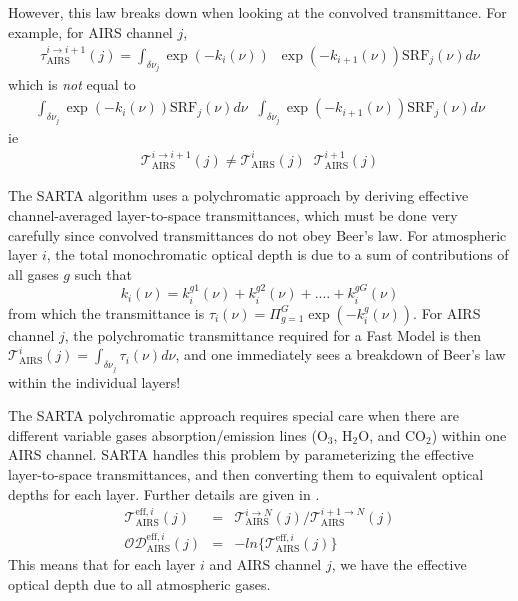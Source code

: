 \documentclass[11pt]{article}
\newcommand{\sa}{\textsf{SARTA}\xspace}
\newcommand{\cd}{CO$_2$\xspace}
\newcommand{\water}{H$_2$O\xspace}
\newcommand{\ozone}{O$_3$\xspace}
\begin{document}
However, this law breaks down when looking at the convolved
transmittance. For example, for AIRS channel $j$,
\begin{eqnarray*}
  \tau_{\text{AIRS}}^{i \rightarrow i+1}(j) = \int_{\delta \nu_{j}} \exp(-k_{i}(\nu)) \;\; \exp(-k_{i+1}(\nu)) \text{SRF}_{j}(\nu) d\nu
\end{eqnarray*}
which is \emph{not} equal to
\begin{eqnarray*}
  \int_{\delta \nu_{j}} \exp(-k_{i}(\nu)) \text{SRF}_{j}(\nu) d\nu \;\; \int_{\delta \nu_{j}} \exp(-k_{i+1}(\nu)) \text{SRF}_{j}(\nu) d\nu
\end{eqnarray*}
ie
\begin{eqnarray*}
  \mathcal{T}_{\text{AIRS}}^{i \rightarrow i+1}(j) \ne  \mathcal{T}_{\text{AIRS}}^{i}(j) \;\; \mathcal{T}_{\text{AIRS}}^{i+1}(j)
\end{eqnarray*}

The \sa algorithm uses a polychromatic approach by deriving effective
channel-averaged layer-to-space transmittances, which must be done
very carefully since convolved transmittances do not obey Beer's law.
For atmospheric layer $i$, the total monochromatic optical depth is
due to a sum of contributions of all gases $g$ such that
\[
k_i(\nu) = k_i^{g1}(\nu) + k_i^{g2}(\nu) + .... + k_i^{gG}(\nu)
\]
from which the transmittance is $\tau_{i}(\nu) = \Pi_{g=1}^G
\exp(-k_i^{g}(\nu))$. For AIRS channel $j$, the polychromatic
transmittance required for a Fast Model is then
$\mathcal{T}_{\text{AIRS}}^{i}(j) = \int_{\delta \nu_{j}}
\tau_{i}(\nu) d\nu$, and one immediately sees a breakdown of Beer's
law within the individual layers!


The \sa polychromatic approach requires special care when there are
different variable gases absorption/emission lines (\ozone, \water,
and \cd) within one \textsf{AIRS} channel. \sa handles this problem by
parameterizing the effective layer-to-space transmittances, and then
converting them to equivalent optical depths for each layer. Further
details are given in \cite{han:02*1,str:02*2}.
\begin{eqnarray*}
  \mathcal{T}^{\text{eff},i}_{\text{AIRS}}(j) & = & \mathcal{T}_{\text{AIRS}}^{i \rightarrow N}(j) / \mathcal{T}_{\text{AIRS}}^{i+1 \rightarrow N}(j) \\
  \mathcal{OD}^{\text{eff},i}_{\text{AIRS}}(j) & = & -ln\{\mathcal{T}^{\text{eff},i}_{\text{AIRS}}(j) \}
\end{eqnarray*}
This means that for each layer $i$ and AIRS channel $j$, we have the
effective optical depth due to all atmospheric gases.
\end{document}
